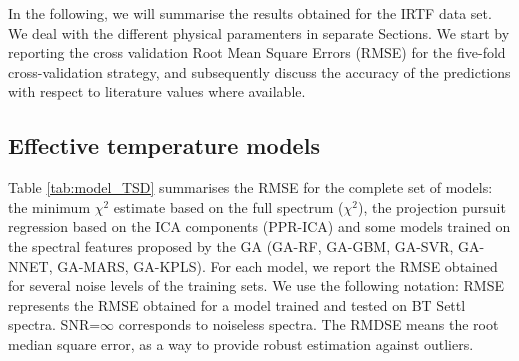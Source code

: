 
In the following, we will summarise the results obtained for the IRTF
data set. We deal with the different physical paramenters in separate
Sections. We start by reporting the cross validation Root Mean Square
Errors (RMSE) for the five-fold cross-validation strategy, and
subsequently discuss the accuracy of the predictions with respect to
literature values where available.

\subsection{Effective temperature models}

Table \ref{tab:model_TSD} summarises the RMSE for the complete set of
models: the minimum $\chi^2$ estimate based on the full spectrum
($\chi^2$), the projection pursuit regression based on the ICA
components (PPR-ICA) and some models trained on the spectral
features proposed by the GA (GA-RF, 
GA-GBM, GA-SVR, GA-NNET, GA-MARS, GA-KPLS). For each model, we report
the RMSE obtained for several noise levels of the training sets. 
We use the following notation: RMSE represents the RMSE
obtained for a model trained and tested on BT Settl spectra. 
SNR=$\infty$ corresponds to noiseless spectra. 
The RMDSE means the root median square error, as a way to provide 
robust estimation against outliers.

